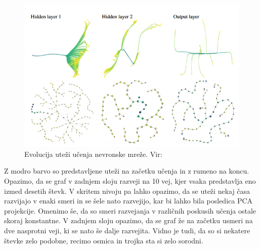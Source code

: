 \begin{figure}[H]
    \centering
    \includegraphics[width=1\linewidth]{slike/mapper-minst.png}
    \caption{Evolucija uteži učenja nevronske mreže. Vir: \cite{Gabella_2021}}
    \label{fig:backprop}
\end{figure}
Z modro barvo so predstavljene uteži na začetku učenja in z rumeno na koncu. Opazimo, da se graf v zadnjem sloju razveji na 10 vej, kjer vsaka predstavlja eno izmed desetih števk. V skritem nivoju pa lahko opazimo, da se uteži nekaj časa razvijajo v enaki smeri in se šele nato razvejijo, kar bi lahko bila posledica PCA projekcije. Omenimo še, da so smeri razvejanja v različnih poskusih učenja ostale skoraj konstantne. V zadnjem sloju opazimo, da se graf že na začetku usmeri na dve nasprotni veji, ki se nato še dalje razvejita. Vidno je tudi, da so si nekatere števke zelo podobne, recimo osmica in trojka sta si zelo sorodni.
